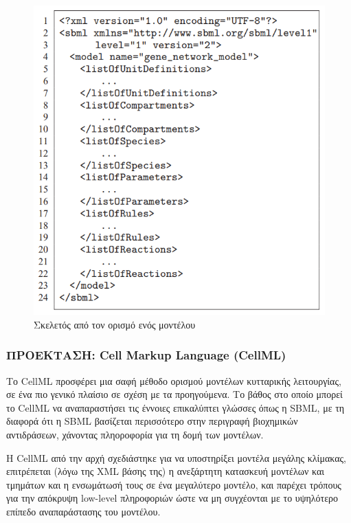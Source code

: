             \begin{figure}[ht] \noindent\centering
                \includegraphics[scale=0.7]{img/SBML skeleton}
                \caption{Σκελετός από τον ορισμό ενός μοντέλου \cite{SBML}}
            \end{figure}

        \subsubsection{ΠΡΟΕΚΤΑΣΗ: Cell Markup Language (CellML)}
            Το CellML προσφέρει μια σαφή μέθοδο ορισμού μοντέλων κυτταρικής λειτουργίας, σε ένα πιο γενικό πλαίσιο σε σχέση με τα προηγούμενα. \cite{CellML}
            Το βάθος στο οποίο μπορεί το CellML να αναπαραστήσει τις έννοιες επικαλύπτει γλώσσες όπως η SBML, με τη διαφορά ότι η SBML βασίζεται περισσότερο στην περιγραφή βιοχημικών αντιδράσεων, χάνοντας πληοροφορία για τη δομή των μοντέλων.

            Η CellML από την αρχή σχεδιάστηκε για να υποστηρίξει μοντέλα μεγάλης κλίμακας, επιτρέπεται (λόγω της XML βάσης της) η ανεξάρτητη κατασκευή μοντέλων και τμημάτων και η ενσωμάτωσή τους σε ένα μεγαλύτερο μοντέλο, και παρέχει τρόπους για την απόκρυψη low-level πληροφοριών ώστε να μη συγχέονται με το υψηλότερο επίπεδο αναπαράστασης του μοντέλου.

